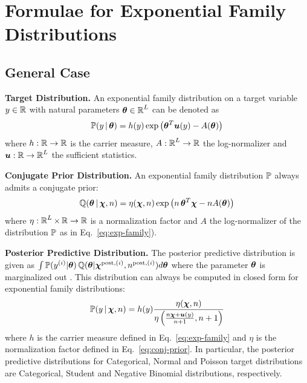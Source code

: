 \section{Formulae for Exponential Family Distributions}
\label{sec:formulae}

\subsection{General Case}

\textbf{Target Distribution.} An exponential family distribution on a target variable $y \in \operatorname{\mathbb{R}}$ with natural parameters $\bm{\theta} \in \operatorname{\mathbb{R}}^L$ can be denoted as
%
\begin{equation} \label{eq:exp-family}
    \mathbb{P}(y \,|\, \bm{\theta}) = h(y) \exp\left(\bm{\theta}^T \bm{u}(y) - A(\bm{\theta})\right)
\end{equation}
%
where ${h: \operatorname{\mathbb{R}} \rightarrow \operatorname{\mathbb{R}}}$ is the carrier measure, ${A: \operatorname{\mathbb{R}}^L \rightarrow \operatorname{\mathbb{R}}}$ the log-normalizer and ${\bm{u}: \operatorname{\mathbb{R}} \rightarrow \operatorname{\mathbb{R}}^L}$ the sufficient statistics.

\textbf{Conjugate Prior Distribution.} An exponential family distribution $\mathbb{P}$ always admits a conjugate prior:
%
\begin{equation}\label{eq:conj-prior}
    \operatorname{\mathbb{Q}}(\bm{\theta} \,|\, \bm{\chi}, n) = \eta(\bm{\chi}, n) \exp\left( n \, \bm{\theta}^T\bm{\chi}  - n A(\bm{\theta}) \right)
\end{equation}
%
where $\eta : \operatorname{\mathbb{R}}^L \times \operatorname{\mathbb{R}} \rightarrow \operatorname{\mathbb{R}}$ is a normalization factor and $A$ the log-normalizer of the distribution $\mathbb{P}$ as in Eq.~\ref{eq:exp-family}).

\textbf{Posterior Predictive Distribution.} The posterior predictive distribution is given as $\int \mathbb{P}(y^{(i)}|\bm{\theta})\operatorname{\mathbb{Q}}(\bm{\theta}|\bm{\chi}^{\text{post}, (i)}, n^{\text{post}, (i)}) d\bm{\theta}$ where the parameter $\bm{\theta}$ is marginalized out  \citep{uncertainty-deep-learning}. This distribution can always be computed in closed form for exponential family distributions:
%
\begin{align}
\mathbb{P}(y \,|\, \bm{\chi}, n) = h(y) \frac{\eta(\bm{\chi}, n)}{\eta\left(\frac{n \bm{\chi} + \bm{u}(y)}{n +1}, n + 1 \right)}
\end{align}
%
where $h$ is the carrier measure defined in Eq.~\ref{eq:exp-family} and $\eta$ is the normalization factor defined in Eq.~\ref{eq:conj-prior}. In particular, the posterior predictive distributions for Categorical, Normal and Poisson target distributions are Categorical, Student and Negative Binomial distributions, respectively.

